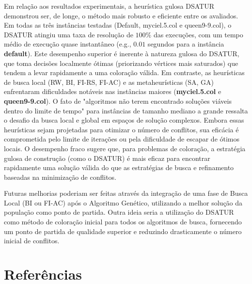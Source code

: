 \documentclass[12pt,a4paper]{article}
\begin{document}
Em relação aos resultados experimentais, a heurística gulosa DSATUR demonstrou ser, de longe, o método mais robusto e eficiente entre os avaliados. Em todas as três instâncias testadas (Default, myciel.5.col e queen9-9.col), o DSATUR atingiu uma taxa de resolução de $100\%$ das execuções, com um tempo médio de execução quase instantâneo (e.g., $0.01$ segundos para a instância \textbf{default}). Este desempenho superior é inerente à natureza gulosa do DSATUR, que toma decisões localmente ótimas (priorizando vértices mais saturados) que tendem a levar rapidamente a uma coloração válida.
Em contraste, as heurísticas de busca local (RW, BI, FI-RS, FI-AC) e as metaheurísticas (SA, GA) enfrentaram dificuldades notáveis nas instâncias maiores (\textbf{myciel.5.col} e \textbf{queen9-9.col}). O fato de "algoritmos não terem encontrado soluções viáveis dentro do limite de tempo" para instâncias de tamanho mediano a grande ressalta o desafio da busca local e global em espaços de solução complexos. Embora essas heurísticas sejam projetadas para otimizar o número de conflitos, sua eficácia é comprometida pelo limite de iterações ou pela dificuldade de escapar de ótimos locais. O desempenho fraco sugere que, para problemas de coloração, a estratégia gulosa de construção (como o DSATUR) é mais eficaz para encontrar rapidamente uma solução válida do que as estratégias de busca e refinamento baseadas na minimização de conflitos.

Futuras melhorias poderiam ser feitas através da integração de uma fase de Busca Local (BI ou FI-AC) após o Algoritmo Genético, utilizando a melhor solução da população como ponto de partida. Outra ideia seria a utilização do DSATUR como método de coloração inicial para todos os algoritmos de busca, fornecendo um ponto de partida de qualidade superior e reduzindo drasticamente o número inicial de conflitos.

\cleardoublepage
{}
\section*{Referências}
\end{document}
